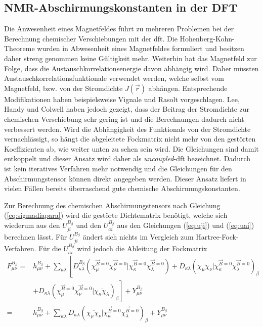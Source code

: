 \subsection{NMR-Abschirmungskonstanten in der DFT}    
	Die Anwesenheit eines Magnetfeldes führt zu mehreren Problemen bei der Berechnung chemischer Verschiebungen mit der \ac{dft}. Die Hohenberg-Kohn-Theoreme wurden in Abwesenheit eines Magnetfeldes formuliert und besitzen daher streng genommen keine Gültigkeit mehr.\supercite{rajagopal1973inhomogeneous,vignale1988current} Weiterhin hat das Magnetfeld zur Folge, dass die Austauschkorrelationsenergie davon abhängig wird.\supercite{buhl1999dft} Daher müssten Austauschkorrelationsfunktionale verwendet werden, welche selbst vom Magnetfeld, bzw. von der Stromdichte $J(\vec{r})$ abhängen. Entsprechende Modifikationen haben beispielsweise Vignale und Rasolt vorgeschlagen.\supercite{vignale1988current,vignale1987density} Lee, Handy und Colwell \supercite{lee1995density} haben jedoch gezeigt, dass der Beitrag der Stromdichte zur chemischen Verschiebung sehr gering ist und die Berechnungen dadurch nicht verbessert werden. Wird die Abhängigkeit des Funktionals von der Stromdichte vernachlässigt, so hängt die abgeleitete Fockmatrix nicht mehr von den gestörten Koeffizienten ab, wie weiter unten zu sehen sein wird. Die Gleichungen sind damit entkoppelt und dieser Ansatz wird daher als \textit{uncoupled}-\ac{dft} bezeichnet.\supercite{bieger1985lcao,malkin1993calculations} Dadurch ist kein iteratives Verfahren mehr notwendig und die Gleichungen für den Abschirmungstensor können direkt angegeben werden.  Dieser Ansatz liefert in vielen Fällen bereits überraschend gute chemische Abschirmungskonstanten.\supercite{buhl1999dft}
	
\bigskip
Zur Berechnung des chemischen Abschirmungstensors nach Gleichung (\ref{eq:sigmadiapara}) wird die gestörte Dichtematrix benötigt, welche sich wiederum aus den $U_{ji}^{B_\beta}$ und den $U_{ai}^{B_\beta}$ aus den Gleichungen (\ref{eq:uji}) und (\ref{eq:uai}) berechnen lässt. Für $U_{ji}^{B_\beta}$ ändert sich nichts im Vergleich zum Hartree-Fock-Verfahren. Für die $U_{ai}^{B_\beta}$ wird jedoch die Ableitung der Fockmatrix 
    \begin{equation}\label{eq:fmunudbdft}
    \begin{aligned}
    F_{\mu\nu}^{B_\beta}=&h_{\mu\nu}^{B_\beta}+\sum_{\kappa\lambda}\left[D_{\kappa\lambda}^{B_\beta}\left(\chi_\mu^{\vec{B}=0}\chi_\nu^{\vec{B}=0}\vert\chi_\kappa^{\vec{B}=0}\chi_\lambda^{\vec{B}=0}\right)+D_{\kappa\lambda}\left(\overline{\chi_\mu\chi_\nu}\vert\chi_\kappa^{\vec{B}=0}\chi_\lambda^{\vec{B}=0}\right)_{\beta}\right.\\
    &+\left.D_{\kappa\lambda}\left(\chi_\mu^{\vec{B}=0}\chi_\nu^{\vec{B}=0}\vert\overline{\chi_\kappa\chi_\lambda}\right)_{\beta}\right]+Y_{\mu\nu}^{B_\beta}\\
    =&h_{\mu\nu}^{B_\beta}+\sum_{\kappa\lambda}D_{\kappa\lambda}\left(\overline{\chi_\mu\chi_\nu}\vert\chi_\kappa^{\vec{B}=0}\chi_\lambda^{\vec{B}=0}\right)_{\beta}+Y_{\mu\nu}^{B_\beta}
    \end{aligned}
    \end{equation}

